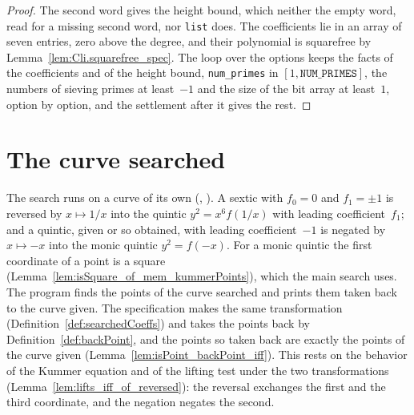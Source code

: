 \begin{proof}
  \leanok
  The second word gives the height bound, which neither the empty word, read for a missing second
  word, nor \texttt{list} does. The coefficients lie in an array of seven entries, zero above the
  degree, and their polynomial is squarefree by Lemma~\ref{lem:Cli.squarefree_spec}. The loop over
  the options keeps the facts of the coefficients and of the height bound, \texttt{num\_primes} in
  $[1, \mathtt{NUM\_PRIMES}]$, the numbers of sieving primes at least~$-1$ and the size of the bit
  array at least~$1$, option by option, and the settlement after it gives the rest.
\end{proof}


\section{The curve searched}\label{sec:transform}

The search runs on a curve of its own (,
). A sextic with $f_0 = 0$ and $f_1 = \pm 1$ is reversed by $x
\mapsto 1/x$ into the quintic $y^2 = x^6 f(1/x)$ with leading coefficient~$f_1$; and a quintic,
given or so obtained, with leading coefficient~$-1$ is negated by $x \mapsto -x$ into the monic
quintic $y^2 = f(-x)$. For a monic quintic the first coordinate of a point is a square
(Lemma~\ref{lem:isSquare_of_mem_kummerPoints}), which the main search uses. The program finds the
points of the curve searched and prints them taken back to the curve given. The specification
makes the same transformation (Definition~\ref{def:searchedCoeffs}) and takes the points back by
Definition~\ref{def:backPoint}, and the points so taken back are exactly the points of the curve
given (Lemma~\ref{lem:isPoint_backPoint_iff}). This rests on the behavior of the Kummer equation
and of the lifting test under the two transformations (Lemma~\ref{lem:lifts_iff_of_reversed}): the
reversal exchanges the first and the third coordinate, and the negation negates the second.


